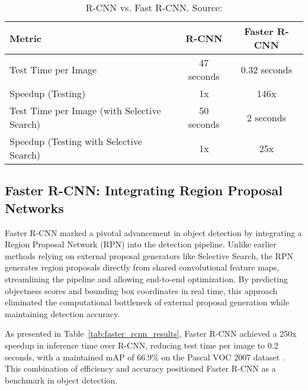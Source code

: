 \documentclass[3p,times]{elsarticle}
\begin{document}
\begin{table}[H]
\centering
\caption{R-CNN vs. Fast R-CNN. Source: \cite{ren2016fasterrcnnrealtimeobject}}
\label{tab:region_proposal_speedup}
\begin{tabular}{|l|c|c|}
\hline
\textbf{Metric}                                & \textbf{R-CNN}     & \textbf{Faster R-CNN} \\ \hline
Test Time per Image                            & 47 seconds         & 0.32 seconds          \\ \hline
Speedup (Testing)                              & 1x                 & 146x                  \\ \hline
Test Time per Image (with Selective Search)    & 50 seconds         & 2 seconds             \\ \hline
Speedup (Testing with Selective Search)        & 1x                 & 25x                   \\ \hline
\end{tabular}
\end{table}

\subsection{Faster R-CNN: Integrating Region Proposal Networks}

Faster R-CNN marked a pivotal advancement in object detection by integrating a Region Proposal Network (RPN) into the detection pipeline. Unlike earlier methods relying on external proposal generators like Selective Search, the RPN generates region proposals directly from shared convolutional feature maps, streamlining the pipeline and allowing end-to-end optimization. By predicting objectness scores and bounding box coordinates in real time, this approach eliminated the computational bottleneck of external proposal generation while maintaining detection accuracy.

As presented in Table~\ref{tab:faster_rcnn_results}, Faster R-CNN achieved a 250x speedup in inference time over R-CNN, reducing test time per image to 0.2 seconds, with a maintained mAP of 66.9\% on the Pascal VOC 2007 dataset \citet{ren2016fasterrcnnrealtimeobject}. This combination of efficiency and accuracy positioned Faster R-CNN as a benchmark in object detection.
\end{document}
